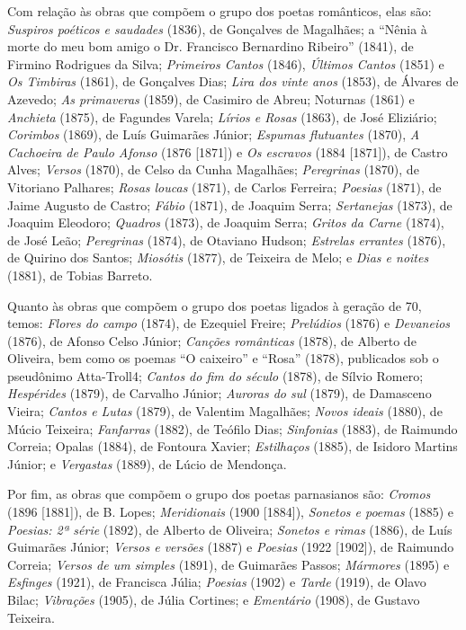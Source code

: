 \documentclass[portuguese]{textolivre}
\begin{document}
Com relação às obras que compõem o grupo dos poetas românticos, elas são: \textit{Suspiros poéticos e saudades} (1836), de Gonçalves de Magalhães; a “Nênia à morte do meu bom amigo o Dr. Francisco Bernardino Ribeiro” (1841), de Firmino Rodrigues da Silva; \textit{Primeiros Cantos} (1846), \textit{Últimos Cantos} (1851) e \textit{Os Timbiras} (1861), de Gonçalves Dias; \textit{Lira dos vinte anos} (1853), de Álvares de Azevedo; \textit{As primaveras} (1859), de Casimiro de Abreu; Noturnas (1861) e \textit{Anchieta} (1875), de Fagundes Varela; \textit{Lírios e Rosas} (1863), de José Eliziário; \textit{Corimbos} (1869), de Luís Guimarães Júnior; \textit{Espumas flutuantes} (1870), \textit{A Cachoeira de Paulo Afonso} (1876 [1871]) e \textit{Os escravos} (1884 [1871]), de Castro Alves; \textit{Versos} (1870), de Celso da Cunha Magalhães; \textit{Peregrinas} (1870), de Vitoriano Palhares; \textit{Rosas loucas} (1871), de Carlos Ferreira; \textit{Poesias} (1871), de Jaime Augusto de Castro; \textit{Fábio} (1871), de Joaquim Serra; \textit{Sertanejas} (1873), de Joaquim Eleodoro; \textit{Quadros} (1873), de Joaquim Serra; \textit{Gritos da Carne} (1874), de José Leão; \textit{Peregrinas} (1874), de Otaviano Hudson; \textit{Estrelas errantes} (1876), de Quirino dos Santos; \textit{Miosótis} (1877), de Teixeira de Melo; e \textit{Dias e noites} (1881), de Tobias Barreto.

Quanto às obras que compõem o grupo dos poetas ligados à geração de 70, temos: \textit{Flores do campo} (1874), de Ezequiel Freire; \textit{Prelúdios} (1876) e \textit{Devaneios} (1876), de Afonso Celso Júnior; \textit{Canções românticas} (1878), de Alberto de Oliveira, bem como os poemas “O caixeiro” e “Rosa” (1878), publicados sob o pseudônimo Atta-Troll4; \textit{Cantos do fim do século} (1878), de Sílvio Romero; \textit{Hespérides} (1879), de Carvalho Júnior; \textit{Auroras do sul} (1879), de Damasceno Vieira; \textit{Cantos e Lutas} (1879), de Valentim Magalhães; \textit{Novos ideais} (1880), de Múcio Teixeira; \textit{Fanfarras} (1882), de Teófilo Dias; \textit{Sinfonias} (1883), de Raimundo Correia; Opalas (1884), de Fontoura Xavier; \textit{Estilhaços} (1885), de Isidoro Martins Júnior; e \textit{Vergastas} (1889), de Lúcio de Mendonça.

Por fim, as obras que compõem o grupo dos poetas parnasianos são: \textit{Cromos} (1896 [1881]), de B. Lopes; \textit{Meridionais} (1900 [1884]), \textit{Sonetos e poemas} (1885) e \textit{Poesias: 2ª série} (1892), de Alberto de Oliveira; \textit{Sonetos e rimas} (1886), de Luís Guimarães Júnior; \textit{Versos e versões} (1887) e \textit{Poesias} (1922 [1902]), de Raimundo Correia; \textit{Versos de um simples} (1891), de Guimarães Passos; \textit{Mármores} (1895) e \textit{Esfinges} (1921), de Francisca Júlia; \textit{Poesias} (1902) e \textit{Tarde} (1919), de Olavo Bilac; \textit{Vibrações} (1905), de Júlia Cortines; e \textit{Ementário} (1908), de Gustavo Teixeira.
\end{document}
